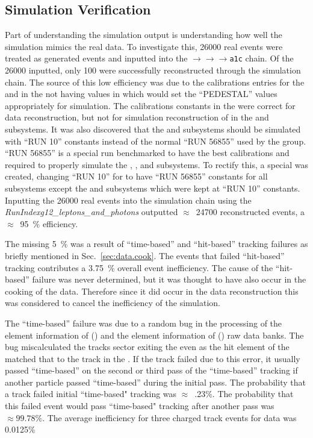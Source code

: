 \subsection{Simulation Verification}\label{sec:analysis.accept.verify}
Part of understanding the simulation output is understanding how well the simulation mimics the real data. To investigate this, 26000 real \epem events were treated as generated events and inputted into the $\to$$\to$$\to$\texttt{a1c} chain. Of the 26000 inputted, only 100 were successfully reconstructed through the simulation chain. The source of this low efficiency was due to the calibrations entries for the  and  in the  not having values in which would set the ``PEDESTAL'' values appropriately for simulation. The calibrations constants in the  were correct for data reconstruction, but not for simulation reconstruction of \epem in the  and  subsystems. It was also discovered that the  and  subsystems should be simulated with ``RUN 10'' constants instead of the normal ``RUN 56855'' used by the  group. ``RUN 56855'' is a special run benchmarked to have the best calibrations and required to properly simulate the , , and  subsystems. To rectify this, a special  was created, changing ``RUN 10'' for to have ``RUN 56855'' constants for all subsystems except the  and  subsystems which were kept at ``RUN 10'' constants. Inputting the 26000 real \epem events into the simulation chain using the  \emph{RunIndexg12\_leptons\_and\_photons} outputted $\approx$~24700 \epem reconstructed events, a $\approx$~95~\% efficiency.

The missing 5~\% was a result of ``time-based'' and ``hit-based'' tracking failures as briefly mentioned in Sec.~\ref{sec:data.cook}. The events that failed ``hit-based'' tracking contributes a 3.75~\% overall event inefficiency. The cause of the ``hit-based'' failure was never determined, but it was thought to have also occur in the cooking of the data. Therefore since it did occur in the data reconstruction this was considered to cancel the inefficiency of the simulation.

The ``time-based'' failure was due to a random bug in the processing of the  element information of  () and the  element information of  () raw data banks. The bug miscalculated the tracks sector exiting the  even as the hit element of the  matched that to the track in the . If the track failed due to this error, it usually passed ``time-based'' on the second or third pass of the ``time-based'' tracking if another particle passed ``time-based'' during the initial pass. The probability that a track failed initial ``time-based" tracking was $\approx$~.23\%. The probability that this failed event would pass ``time-based" tracking after another pass was $\approx99.78\%$. The average inefficiency for three charged track events for data was 0.0125\%

